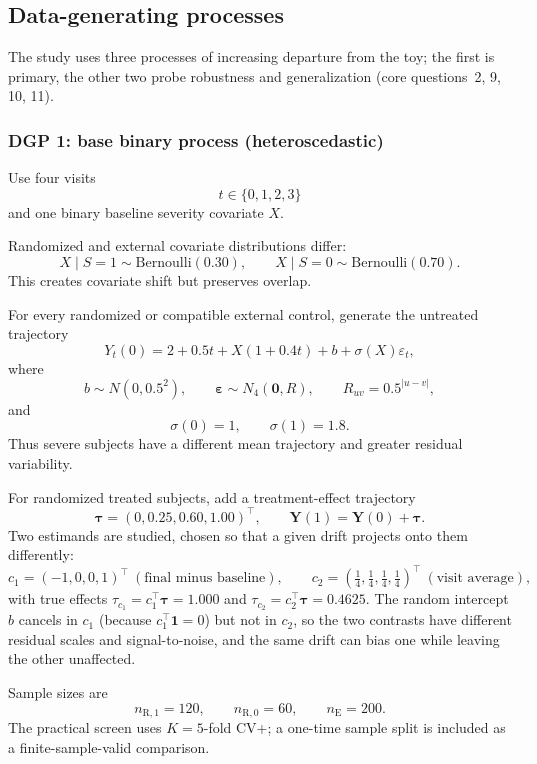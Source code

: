 \documentclass[11pt]{article}
\newcommand{\R}{\mathrm{R}}
\newcommand{\E}{\mathrm{E}}
\begin{document}
\subsection{Data-generating processes}\label{sec:dgps}

The study uses three processes of increasing departure from the toy; the first is primary, the other two probe robustness and generalization (core questions~2, 9, 10, 11).

\subsubsection{DGP 1: base binary process (heteroscedastic)}

Use four visits
\[
t\in\{0,1,2,3\}
\]
and one binary baseline severity covariate $X$.

Randomized and external covariate distributions differ:
\[
X\mid S=1\sim\mathrm{Bernoulli}(0.30),
\qquad
X\mid S=0\sim\mathrm{Bernoulli}(0.70).
\tag{17}
\]
This creates covariate shift but preserves overlap.

For every randomized or compatible external control, generate the untreated trajectory
\[
Y_t(0)
=
2+0.5t+X(1+0.4t)+b+\sigma(X)\varepsilon_t,
\tag{18}
\]
where
\[
b\sim N(0,0.5^2),
\qquad
\bm\varepsilon\sim N_4(\bm 0,R),
\qquad
R_{uv}=0.5^{|u-v|},
\]
and
\[
\sigma(0)=1,
\qquad
\sigma(1)=1.8.
\tag{19}
\]
Thus severe subjects have a different mean trajectory and greater residual variability.

For randomized treated subjects, add a treatment-effect trajectory
\[
\bm\tau=(0,0.25,0.60,1.00)^{\top},
\qquad
\bm Y(1)=\bm Y(0)+\bm\tau.
\tag{20}
\]
Two estimands are studied, chosen so that a given drift projects onto them differently:
\[
c_1=(-1,0,0,1)^{\top}\ (\text{final minus baseline}),
\qquad
c_2=(\tfrac14,\tfrac14,\tfrac14,\tfrac14)^{\top}\ (\text{visit average}),
\tag{21}
\]
with true effects $\tau_{c_1}=c_1^{\top}\bm\tau=1.000$ and $\tau_{c_2}=c_2^{\top}\bm\tau=0.4625$. The random intercept $b$ cancels in $c_1$ (because $c_1^{\top}\bm 1=0$) but not in $c_2$, so the two contrasts have different residual scales and signal-to-noise, and the same drift can bias one while leaving the other unaffected.

Sample sizes are
\[
n_{\R,1}=120,
\qquad
n_{\R,0}=60,
\qquad
n_{\E}=200.
\tag{22}
\]
The practical screen uses $K=5$-fold CV+; a one-time sample split is included as a finite-sample-valid comparison.
\end{document}
